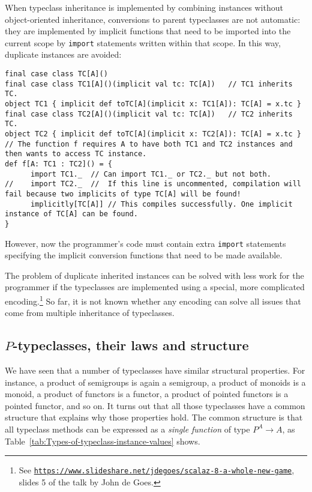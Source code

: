When typeclass inheritance is implemented by combining instances without
object-oriented inheritance, conversions to parent typeclasses are
not automatic: they are implemented by implicit functions that need
to be imported into the current scope by \lstinline!import! statements
written within that scope. In this way, duplicate instances are avoided:
\begin{lstlisting}
final case class TC[A]()
final case class TC1[A]()(implicit val tc: TC[A])   // TC1 inherits TC.
object TC1 { implicit def toTC[A](implicit x: TC1[A]): TC[A] = x.tc }
final case class TC2[A]()(implicit val tc: TC[A])   // TC2 inherits TC.
object TC2 { implicit def toTC[A](implicit x: TC2[A]): TC[A] = x.tc }
// The function f requires A to have both TC1 and TC2 instances and then wants to access TC instance.
def f[A: TC1 : TC2]() = {
      import TC1._  // Can import TC1._ or TC2._ but not both.
//    import TC2._  //  If this line is uncommented, compilation will fail because two implicits of type TC[A] will be found!
      implicitly[TC[A]] // This compiles successfully. One implicit instance of TC[A] can be found.
}
\end{lstlisting}
However, now the programmer\textsf{'}s code must contain extra \lstinline!import!
statements specifying the implicit conversion functions that need
to be made available.

The problem of duplicate inherited instances can be solved with less
work for the programmer if the typeclasses are implemented using a
special, more complicated encoding.\footnote{See \texttt{\href{https://www.slideshare.net/jdegoes/scalaz-8-a-whole-new-game}{https://www.slideshare.net/jdegoes/scalaz-8-a-whole-new-game}},
slides 5 of the talk by John de
Goes.} So far, it is not known whether any encoding can solve all issues
that come from multiple inheritance of typeclasses.

\subsection{$P$-typeclasses, their laws and structure\label{subsec:P-typeclasses}}

We have seen that a number of typeclasses have similar structural
properties. For instance, a product of semigroups is again a semigroup,
a product of monoids is a monoid, a product of functors is a functor,
a product of pointed functors is a pointed functor, and so on. It
turns out that all those typeclasses have a common structure that
explains why those properties hold. The common structure is that all
typeclass methods can be expressed as a \emph{single} \emph{function}
of type $P^{A}\rightarrow A$, as Table~\ref{tab:Types-of-typeclass-instance-values}
shows.

